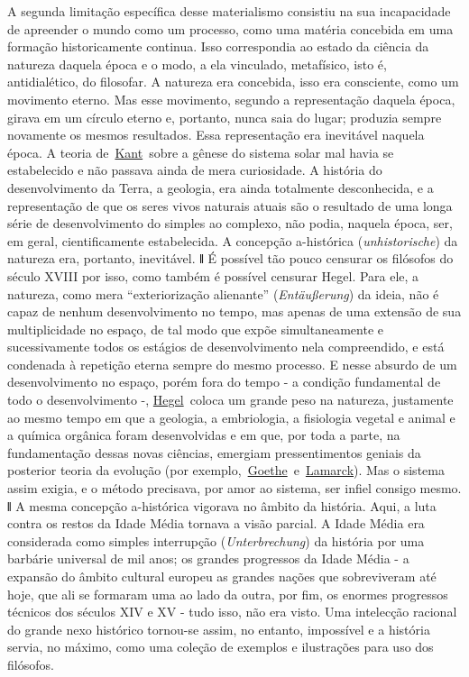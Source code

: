 A segunda limitação específica desse materialismo consistiu na sua
incapacidade de apreender o mundo como um processo, como uma matéria
concebida em uma formação historicamente continua. Isso correspondia ao
estado da ciência da natureza daquela época e o modo, a ela vinculado,
metafísico, isto é, antidialético, do filosofar. A natureza era
concebida, isso era consciente, como um movimento eterno. Mas esse
movimento, segundo a representação daquela época, girava em um círculo
eterno e, portanto, nunca saia do lugar; produzia sempre novamente os
mesmos resultados. Essa representação era inevitável naquela época. A
teoria
de~\href{https://www.marxists.org/portugues/dicionario/verbetes/k/kant.htm}{Kant}~sobre
a gênese do sistema solar mal havia se estabelecido e não passava ainda
de mera curiosidade. A história do desenvolvimento da Terra, a geologia,
era ainda totalmente desconhecida, e a representação de que os seres
vivos naturais atuais são o resultado de uma longa série de
desenvolvimento do simples ao complexo, não podia, naquela época, ser,
em geral, cientificamente estabelecida. A concepção a-histórica
(\emph{unhistorische}) da natureza era, portanto, inevitável. \textbf{ǁ}
É possível tão pouco censurar os filósofos do século XVIII por isso,
como também é possível censurar Hegel. Para ele, a natureza, como mera
``exteriorização alienante'' (\emph{Entäußerung}) da ideia, não é capaz
de nenhum desenvolvimento no tempo, mas apenas de uma extensão de sua
multiplicidade no espaço, de tal modo que expõe simultaneamente e
sucessivamente todos os estágios de desenvolvimento nela compreendido, e
está condenada à repetição eterna sempre do mesmo processo. E nesse
absurdo de um desenvolvimento no espaço, porém fora do tempo - a
condição fundamental de todo o desenvolvimento -,
\href{https://www.marxists.org/portugues/dicionario/verbetes/h/hegel.htm}{Hegel}~coloca
um grande peso na natureza, justamente ao mesmo tempo em que a geologia,
a embriologia, a fisiologia vegetal e animal e a química orgânica foram
desenvolvidas e em que, por toda a parte, na fundamentação dessas novas
ciências, emergiam pressentimentos geniais da posterior teoria da
evolução (por
exemplo,~\href{https://www.marxists.org/portugues/dicionario/verbetes/g/goethe.htm}{Goethe}~e~\href{https://www.marxists.org/portugues/dicionario/verbetes/l/lamarck.htm}{Lamarck}).
Mas o sistema assim exigia, e o método precisava, por amor ao sistema,
ser infiel consigo mesmo. \textbf{ǁ} A mesma concepção a-histórica
vigorava no âmbito da história. Aqui, a luta contra os restos da Idade
Média tornava a visão parcial. A Idade Média era considerada como
simples interrupção (\emph{Unterbrechung}) da história por uma barbárie
universal de mil anos; os grandes progressos da Idade Média - a expansão
do âmbito cultural europeu as grandes nações que sobreviveram até hoje,
que ali se formaram uma ao lado da outra, por fim, os enormes progressos
técnicos dos séculos XIV e XV - tudo isso, não era visto. Uma intelecção
racional do grande nexo histórico tornou-se assim, no entanto,
impossível e a história servia, no máximo, como uma coleção de exemplos
e ilustrações para uso dos filósofos.

